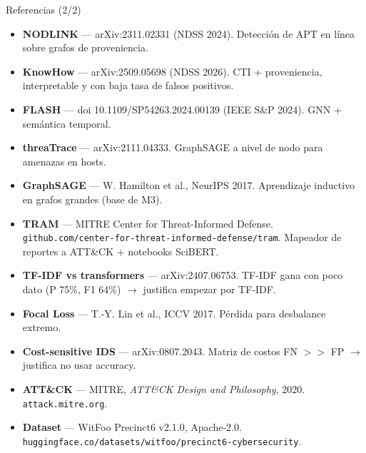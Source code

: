 \documentclass[aspectratio=169,10pt]{beamer}
\begin{document}
\begin{frame}{Referencias (2/2)}
\tiny
\begin{itemize}
\item \textbf{NODLINK} — arXiv:2311.02331 (NDSS 2024). Detección de APT en línea sobre grafos de proveniencia.
\item \textbf{KnowHow} — arXiv:2509.05698 (NDSS 2026). CTI + proveniencia, interpretable y con baja tasa de falsos positivos.
\item \textbf{FLASH} — doi 10.1109/SP54263.2024.00139 (IEEE S\&P 2024). GNN + semántica temporal.
\item \textbf{threaTrace} — arXiv:2111.04333. GraphSAGE a nivel de nodo para amenazas en hosts.
\item \textbf{GraphSAGE} — W. Hamilton et al., NeurIPS 2017. Aprendizaje inductivo en grafos grandes (base de M3).
\item \textbf{TRAM} — MITRE Center for Threat-Informed Defense. \texttt{github.com/center-for-threat-informed-defense/tram}. Mapeador de reportes a ATT\&CK + notebooks SciBERT.
\item \textbf{TF-IDF vs transformers} — arXiv:2407.06753. TF-IDF gana con poco dato (P 75\%, F1 64\%) $\to$ justifica empezar por TF-IDF.
\item \textbf{Focal Loss} — T.-Y. Lin et al., ICCV 2017. Pérdida para desbalance extremo.
\item \textbf{Cost-sensitive IDS} — arXiv:0807.2043. Matriz de costos FN $>>$ FP $\to$ justifica no usar accuracy.
\item \textbf{ATT\&CK} — MITRE, \textit{ATT\&CK Design and Philosophy}, 2020. \texttt{attack.mitre.org}.
\item \textbf{Dataset} — WitFoo Precinct6 v2.1.0, Apache-2.0. \texttt{huggingface.co/datasets/witfoo/precinct6-cybersecurity}.
\end{itemize}
\end{frame}
\end{document}
